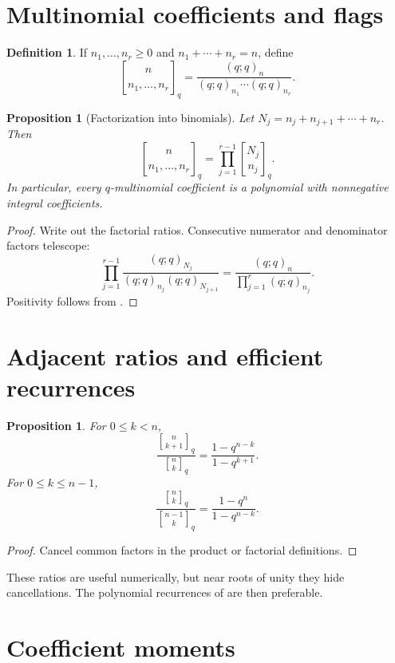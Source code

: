 \documentclass[11pt,oneside,openany]{book}
\newtheorem{proposition}[theorem]{Proposition}
\theoremstyle{definition}
\newtheorem{definition}[theorem]{Definition}
\theoremstyle{remark}
\newcommand{\qbinom}[2]{\genfrac{[}{]}{0pt}{}{#1}{#2}_{q}}
\begin{document}
\section{Multinomial coefficients and flags}

\begin{definition}
If $n_1,\dots,n_r\ge0$ and $n_1+\cdots+n_r=n$, define
\[
 \genfrac{[}{]}{0pt}{}{n}{n_1,\ldots,n_r}_q
 =\frac{(q;q)_n}{(q;q)_{n_1}\cdots(q;q)_{n_r}}.
\]
\end{definition}

\begin{proposition}[Factorization into binomials]\label{prop:qmult-factor}
Let $N_j=n_j+n_{j+1}+\cdots+n_r$.  Then
\[
 \genfrac{[}{]}{0pt}{}{n}{n_1,\ldots,n_r}_q
 =\prod_{j=1}^{r-1}\genfrac{[}{]}{0pt}{}{N_j}{n_j}_q.
\]
In particular, every $q$-multinomial coefficient is a polynomial with nonnegative integral coefficients.
\end{proposition}

\begin{proof}
Write out the factorial ratios.  Consecutive numerator and denominator factors telescope:
\[
 \prod_{j=1}^{r-1}
 \frac{(q;q)_{N_j}}{(q;q)_{n_j}(q;q)_{N_{j+1}}}
 =\frac{(q;q)_n}{\prod_{j=1}^{r}(q;q)_{n_j}}.
\]
Positivity follows from .
\end{proof}

\section{Adjacent ratios and efficient recurrences}

\begin{proposition}\label{prop:adjacent-ratio}
For $0\le k<n$,
\[
 \frac{\qbinom n{k+1}}{\qbinom nk}
 =\frac{1-q^{n-k}}{1-q^{k+1}}.
\]
For $0\le k\le n-1$,
\[
 \frac{\qbinom n k}{\qbinom{n-1}k}
 =\frac{1-q^n}{1-q^{n-k}}.
\]
\end{proposition}

\begin{proof}
Cancel common factors in the product or factorial definitions.
\end{proof}

These ratios are useful numerically, but near roots of unity they hide cancellations.  The polynomial recurrences of  are then preferable.

\section{Coefficient moments}
\end{document}
